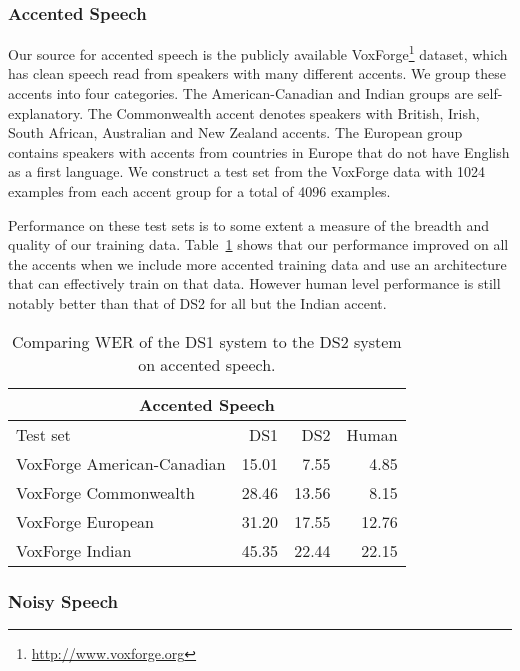 \subsubsection{Accented Speech}

Our source for accented speech is the publicly available
VoxForge\footnote{\url{http://www.voxforge.org}} dataset, which has clean
speech read from speakers with many different accents. We group these accents
into four categories. The American-Canadian and Indian groups are
self-explanatory. The Commonwealth accent denotes speakers with British, Irish,
South African, Australian and New Zealand accents. The European group contains
speakers with accents from countries in Europe that do not have English as a
first language.  We construct a test set from the VoxForge data with 1024
examples from each accent group for a total of 4096 examples.

Performance on these test sets is to some extent a measure of the breadth and
quality of our training data. Table~\ref{table:scaling_asr:voxforge} shows that
our performance improved on all the accents when we include more accented
training data and use an architecture that can effectively train on that data.
However human level performance is still notably better than that of DS2 for
all but the Indian accent. 

\begin{table}
\centering
\begin{tabular}{l  r  r  r}
\toprule
\multicolumn{4}{c}{Accented Speech}\\
\midrule
Test set                   & DS1   & DS2 & Human \\
\midrule
VoxForge American-Canadian & 15.01 & 7.55  & 4.85 \\
VoxForge Commonwealth      & 28.46 & 13.56 & 8.15 \\
VoxForge European          & 31.20 & 17.55 & 12.76 \\
VoxForge Indian            & 45.35 & 22.44 & 22.15 \\
\bottomrule
\end{tabular}
\caption{Comparing WER of the DS1 system to the DS2 system on accented speech.}
\label{table:scaling_asr:voxforge}
\end{table}

\subsubsection{Noisy Speech}

